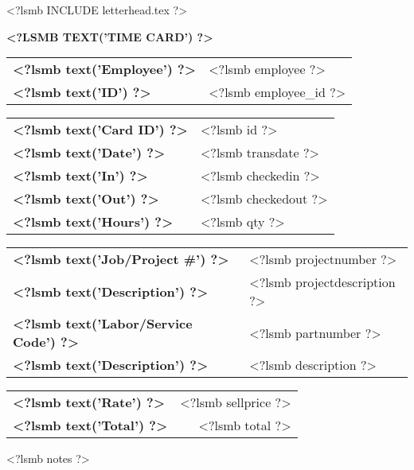 \documentclass{scrartcl}
\begin{document}
\pagestyle{myheadings}
\thispagestyle{empty}

<?lsmb INCLUDE letterhead.tex ?>

\centerline{\textbf{\MakeUppercase{<?lsmb text('Time Card') ?>}}}

\vspace*{0.5cm}

\begin{tabular}[t]{ll}
  \textbf{<?lsmb text('Employee') ?>} & <?lsmb employee ?> \\
  \textbf{<?lsmb text('ID') ?>} & <?lsmb employee_id ?> \\
\end{tabular}
\hfill
\begin{tabular}[t]{ll}
  \textbf{<?lsmb text('Card ID') ?>} & <?lsmb id ?> \\
  \textbf{<?lsmb text('Date') ?>} & <?lsmb transdate ?> \\
  \textbf{<?lsmb text('In') ?>} & <?lsmb checkedin ?> \\
  \textbf{<?lsmb text('Out') ?>} & <?lsmb checkedout ?> \\
  \textbf{<?lsmb text('Hours') ?>} & <?lsmb qty ?> \\
\end{tabular}

\vspace{1cm}

\begin{tabular}[b]{ll}
  \textbf{<?lsmb text('Job/Project #') ?>} & <?lsmb projectnumber ?> \\
  \textbf{<?lsmb text('Description') ?>} & <?lsmb projectdescription ?> \\
  \textbf{<?lsmb text('Labor/Service Code') ?>} & <?lsmb partnumber ?> \\
  \textbf{<?lsmb text('Description') ?>} & <?lsmb description ?> \\
\end{tabular}
\hfill
\begin{tabular}[b]{lr}
  \textbf{<?lsmb text('Rate') ?>} & <?lsmb sellprice ?> \\
  \textbf{<?lsmb text('Total') ?>} & <?lsmb total ?> \\
\end{tabular}
  
\vspace{0.3cm}

<?lsmb notes ?>
 
\end{document}
